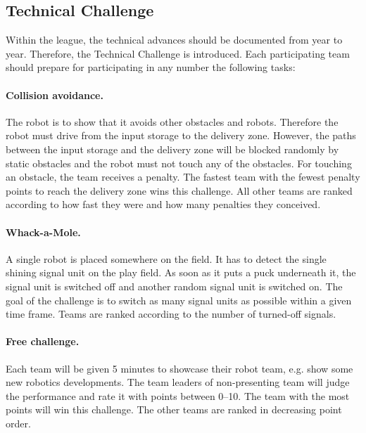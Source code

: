 \documentclass[12pt,twoside]{article}
\begin{document}
\subsection{Technical Challenge}
  
  Within the league, the technical advances should be documented from
  year to year. Therefore, the Technical Challenge is introduced.
  Each participating team should prepare for participating in any
  number the following tasks:


  \paragraph{Collision avoidance.~}
  The robot is to show that it avoids other obstacles and robots.
  Therefore the robot must drive from the input storage to the delivery zone.
  However, the paths between the input storage and the delivery zone will
  be blocked randomly by static obstacles and the robot must not touch any
  of the obstacles. For touching an obstacle, the team receives a penalty.
  The fastest team with the fewest penalty points to reach the delivery
  zone wins this challenge. All other teams are ranked according to
  how fast they were and how many penalties they conceived.
  
  \paragraph{Whack-a-Mole.~}
  A single robot is placed somewhere on the field. It has to detect
  the single shining signal unit on the play field. As soon as it puts
  a puck underneath it, the signal unit is switched off and another
  random signal unit is switched on. The goal of the challenge is to
  switch as many signal units as possible within a given time
  frame. Teams are ranked according to the number of turned-off
  signals.
  

  \paragraph{Free challenge.~}
  Each team will be given 5 minutes to showcase their robot team, e.g.
  show some new robotics developments. The team leaders of
  non-presenting team will judge the performance and rate it with
  points between 0--10.  The team with the most points will win this
  challenge. The other teams are ranked in decreasing point order.
\end{document}
